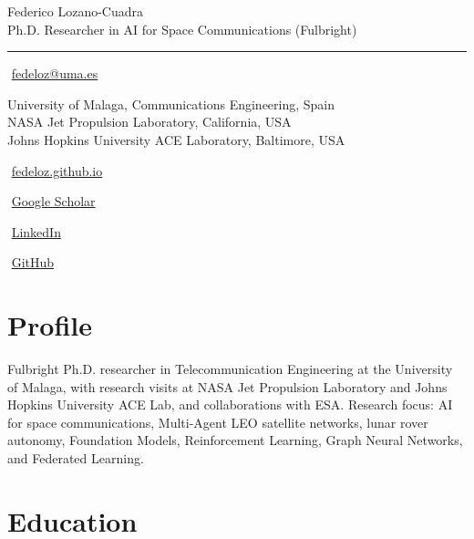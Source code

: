 \documentclass[10.5pt,letterpaper]{article}
\newcommand{\cvname}[1]{{\fontsize{24}{26}\selectfont #1}}
\newcommand{\cvtitle}[1]{{\fontsize{13}{15}\selectfont #1}}
\newcommand{\contacticon}[1]{\raisebox{-0.14ex}{\fontsize{9}{9}\selectfont #1}\,}
\newcommand{\contactline}[2]{#1\,#2\par\vspace{0.1em}}
\begin{document}
\thispagestyle{empty}

{\cvname{Federico Lozano-Cuadra}}\\[0.2em]
{\cvtitle{Ph.D. Researcher in AI for Space Communications (Fulbright)}}

\vspace{0.45em}
\hrule
\vspace{0.75em}

\begin{minipage}[t]{0.66\textwidth}
  \contactline{\contacticon{\faIcon[regular]{envelope}}}{\href{mailto:fedeloz@uma.es}{fedeloz@uma.es}}
  University of Malaga, Communications Engineering, Spain\\[0.12em]
  NASA Jet Propulsion Laboratory, California, USA\\[0.12em]
  Johns Hopkins University ACE Laboratory, Baltimore, USA
\end{minipage}%
\hfill
\begin{minipage}[t]{0.32\textwidth}
  \raggedleft
  \contactline{\contacticon{\faGlobe}}{\href{https://fedeloz.github.io/}{fedeloz.github.io}}
  \contactline{\contacticon{\aiGoogleScholar}}{\href{https://scholar.google.com/citations?user=6PZm2aYAAAAJ}{Google Scholar}}
  \contactline{\contacticon{\faLinkedinIn}}{\href{https://www.linkedin.com/in/federico-lozano-cuadra}{LinkedIn}}
  \contactline{\contacticon{\faGithub}}{\href{https://github.com/fedeloz}{GitHub}}
\end{minipage}
\par\vspace{0.35em}

\section{Profile}
Fulbright Ph.D. researcher in Telecommunication Engineering at the University of Malaga, with research visits at NASA Jet Propulsion Laboratory and Johns Hopkins University ACE Lab, and collaborations with ESA. Research focus: AI for space communications, Multi-Agent LEO satellite networks, lunar rover autonomy, Foundation Models, Reinforcement Learning, Graph Neural Networks, and Federated Learning.

\section{Education}
\end{document}
